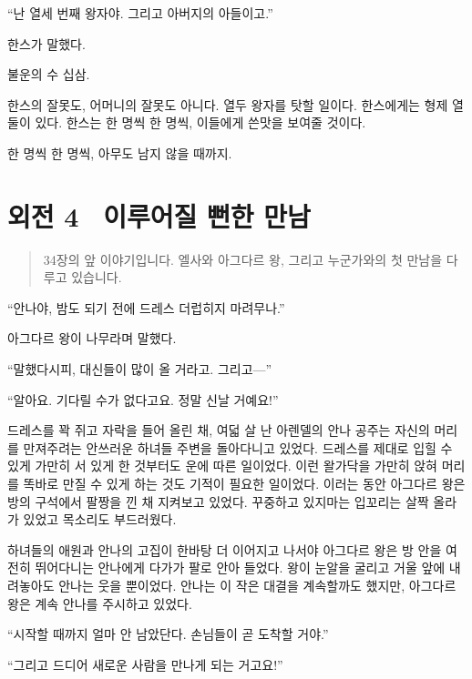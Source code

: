 ``난 열세 번째 왕자야. 그리고 아버지의 아들이고.''

한스가 말했다.

불운의 수 십삼.

한스의 잘못도, 어머니의 잘못도 아니다. 열두 왕자를 탓할 일이다. 한스에게는 형제 열둘이 있다. 한스는 한 명씩 한 명씩, 이들에게 쓴맛을 보여줄 것이다.

한 명씩 한 명씩, 아무도 남지 않을 때까지.



\chapter[외전4. 이루어질 뻔한 만남][외전 4\hspace*{.5em}이루어질 뻔한 만남]{외전 4 \ 이루어질 뻔한 만남}



\begin{quote}

\small 34장의 앞 이야기입니다. 엘사와 아그다르 왕, 그리고 누군가와의 첫 만남을 다루고 있습니다.

\end{quote} %

``안나야, 밤도 되기 전에 드레스 더럽히지 마려무나.''

아그다르 왕이 나무라며 말했다.

``말했다시피, 대신들이 많이 올 거라고. 그리고—''

``알아요. 기다릴 수가 없다고요. 정말 신날 거예요!''

드레스를 꽉 쥐고 자락을 들어 올린 채, 여덟 살 난 아렌델의 안나 공주는 자신의 머리를 만져주려는 안쓰러운 하녀들 주변을 돌아다니고 있었다. 드레스를 제대로 입힐 수 있게 가만히 서 있게 한 것부터도 운에 따른 일이었다. 이런 왈가닥을 가만히 앉혀 머리를 똑바로 만질 수 있게 하는 것도 기적이 필요한 일이었다. 이러는 동안 아그다르 왕은 방의 구석에서 팔짱을 낀 채 지켜보고 있었다. 꾸중하고 있지마는 입꼬리는 살짝 올라가 있었고 목소리도 부드러웠다.

하녀들의 애원과 안나의 고집이 한바탕 더 이어지고 나서야 아그다르 왕은 방 안을 여전히 뛰어다니는 안나에게 다가가 팔로 안아 들었다. 왕이 눈알을 굴리고 거울 앞에 내려놓아도 안나는 웃을 뿐이었다. 안나는 이 작은 대결을 계속할까도 했지만, 아그다르 왕은 계속 안나를 주시하고 있었다.

``시작할 때까지 얼마 안 남았단다. 손님들이 곧 도착할 거야.''

``그리고 드디어 새로운 사람을 만나게 되는 거고요!''

